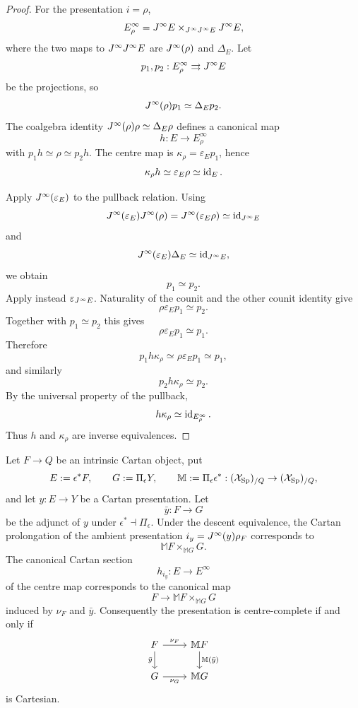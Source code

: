 \begin{proof}
For the presentation $i=\rho$,
\[
    E^\infty_\rho
    =
    J^{\infty} E\times_{J^{\infty}J^{\infty} E}J^{\infty} E,
\]
where the two maps to $J^{\infty}J^{\infty} E$ are $J^{\infty}(\rho)$ and $\Delta_E$.  Let
\[
    p_1,p_2:E^\infty_\rho\rightrightarrows J^{\infty} E
\]
be the projections, so
\[
    J^{\infty}(\rho)p_1\simeq\Delta_Ep_2.
\]
The coalgebra identity $J^{\infty}(\rho)\rho\simeq\Delta_E\rho$ defines a canonical map
\[
    h:E\longrightarrow E^\infty_\rho
\]
with $p_1h\simeq\rho\simeq p_2h$.  The centre map is $\kappa_\rho=\varepsilon_Ep_1$, hence
\[
    \kappa_\rho h\simeq\varepsilon_E\rho\simeq\operatorname{id}_E.
\]

Apply $J^{\infty}(\varepsilon_E)$ to the pullback relation.  Using
\[
    J^{\infty}(\varepsilon_E)J^{\infty}(\rho)
    =
    J^{\infty}(\varepsilon_E\rho)
    \simeq\operatorname{id}_{J^{\infty} E}
\]
and
\[
    J^{\infty}(\varepsilon_E)\Delta_E\simeq\operatorname{id}_{J^{\infty} E},
\]
we obtain
\[
    p_1\simeq p_2.
\]
Apply instead $\varepsilon_{J^{\infty} E}$.  Naturality of the counit and the other counit identity give
\[
    \rho\varepsilon_Ep_1\simeq p_2.
\]
Together with $p_1\simeq p_2$ this gives
\[
    \rho\varepsilon_Ep_1\simeq p_1.
\]
Therefore
\[
    p_1h\kappa_\rho
    \simeq
    \rho\varepsilon_Ep_1
    \simeq p_1,
\]
and similarly
\[
    p_2h\kappa_\rho\simeq p_2.
\]
By the universal property of the pullback,
\[
    h\kappa_\rho\simeq\operatorname{id}_{E^\infty_\rho}.
\]
Thus $h$ and $\kappa_\rho$ are inverse equivalences.
\end{proof}

\begin{theorem}
\label{thm:centre-complete-quotient-criterion}
Let $F\to Q$ be an intrinsic Cartan object, put
\[
    E:=\epsilon^*F,
    \qquad
    G:=\Pi_\epsilon Y,
    \qquad
    \mathbb M:=\Pi_\epsilon\epsilon^*:(\mathcal{X}_{\mathrm{Sp}})_{/Q}\to(\mathcal{X}_{\mathrm{Sp}})_{/Q},
\]
and let $y:E\to Y$ be a Cartan presentation.  Let
\[
    \bar y:F\longrightarrow G
\]
be the adjunct of $y$ under $\epsilon^*\dashv\Pi_\epsilon$.  Under the descent equivalence, the Cartan prolongation of the ambient presentation $i_y=J^{\infty}(y)\rho_F$ corresponds to
\[
    \mathbb M F\times_{\mathbb M G}G.
\]
The canonical Cartan section
\[
    h_{i_y}:E\longrightarrow E^\infty
\]
of the centre map corresponds to the canonical map
\[
    F\longrightarrow\mathbb M F\times_{\mathbb M G}G
\]
induced by $\nu_F$ and $\bar y$.  Consequently the presentation is centre-complete if and only if
\[
\begin{tikzcd}
F \arrow[r,"\nu_F"] \arrow[d,"\bar y"']
& \mathbb M F \arrow[d,"\mathbb M(\bar y)"]
\\
G \arrow[r,"\nu_G"']
& \mathbb M G
\end{tikzcd}
\]
is Cartesian.
\end{theorem}

